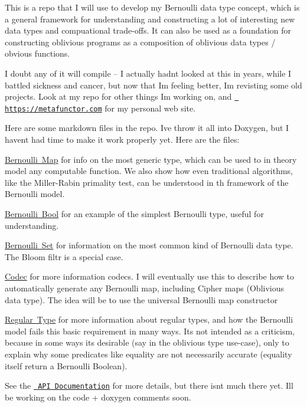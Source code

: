 This is a repo that I will use to develop my Bernoulli data type concept, which is a general framework for understanding and constructing a lot of interesting new data types and compuational trade-\/offs. It can also be used as a foundation for constructing oblivious programs as a composition of oblivious data types / obvious functions.

I doubt any of it will compile -- I actually hadn\textquotesingle{}t looked at this in years, while I battled sickness and cancer, but now that I\textquotesingle{}m feeling better, I\textquotesingle{}m revisting some old projects. Look at my repo for other things I\textquotesingle{}m working on, and \href{https://metafunctor.com}{\texttt{ https\+://metafunctor.\+com}} for my personal web site.

Here are some markdown files in the repo. I\textquotesingle{}ve throw it all into Doxygen, but I haven\textquotesingle{}t had time to make it work properly yet. Here are the files\+:


\begin{DoxyItemize}
\item \mbox{\hyperlink{md_BERNOULLI_MAP}{Bernoulli Map}} for info on the most generic type, which can be used to in theory model any computable function. We also show how even traditional algorithms, like the Miller-\/\+Rabin primality test, can be understood in th framework of the Bernoulli model.
\item \mbox{\hyperlink{md_BERNOULLI_BOOL}{Bernoulli Bool}} for an example of the simplest Bernoulli type, useful for understanding.
\item \mbox{\hyperlink{md_BERNOULLI_SET}{Bernoulli Set}} for information on the most common kind of Bernoulli data type. The Bloom filtr is a special case.
\item \mbox{\hyperlink{md_CODEC}{Codec}} for more information codecs. I will eventually use this to describe how to automatically generate any Bernoulli map, including Cipher maps (Oblivious data type). The idea will be to use the universal Bernoulli map constructor
\item \mbox{\hyperlink{md_REGULAR_TYPE_CONCEPT}{Regular Type}} for more information about regular types, and how the Bernoulli model fails this basic requirement in many ways. It\textquotesingle{}s not intended as a criticism, because in some ways it\textquotesingle{}s desirable (say in the oblivious type use-\/case), only to explain why some predicates like equality are not necessarily accurate (equality itself return a Bernoulli Boolean).
\end{DoxyItemize}

See the \href{docs/html/index.html}{\texttt{ API Documentation}} for more details, but there isn\textquotesingle{}t much there yet. I\textquotesingle{}ll be working on the code + doxygen comments soon. 
